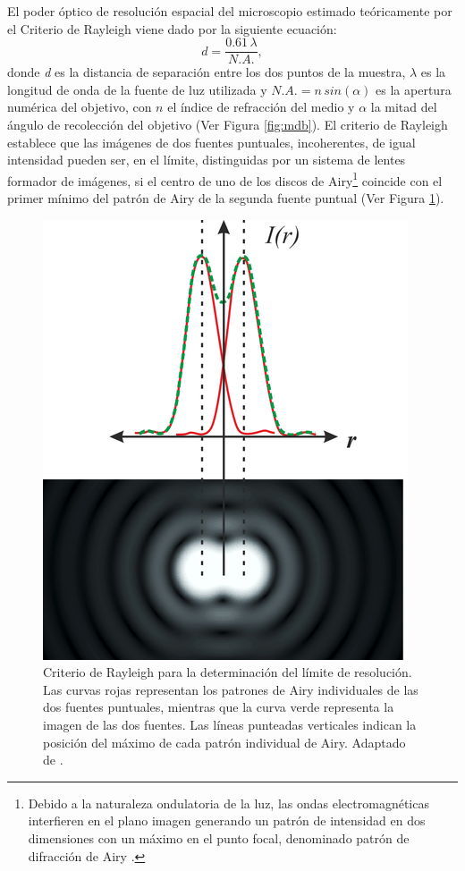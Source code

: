 El poder óptico de resolución espacial del microscopio estimado teóricamente por el Criterio de Rayleigh viene dado por la siguiente ecuación:
\begin{equation}
d = \frac{0.61 \hspace{2pt} \lambda}{ N.A.},
\end{equation}
donde \textit{d} es la distancia de separación entre los dos puntos de la muestra, $\lambda$ es la longitud de onda de la fuente de luz utilizada y $N.A. = n \hspace{2pt} sin(\alpha)$ es la apertura numérica del objetivo, con $n$ el índice de refracción del medio y $\alpha$ la mitad del ángulo de recolección del objetivo (Ver Figura \ref{fig:mdb}). El criterio de Rayleigh establece que las imágenes de dos fuentes puntuales, incoherentes, de igual intensidad pueden ser, en el límite, distinguidas por un sistema de lentes formador de imágenes, si el centro de uno de los discos de Airy\footnote{Debido a la naturaleza ondulatoria de la luz, las ondas
electromagnéticas interfieren en el plano imagen generando un patrón de intensidad en dos dimensiones con
un máximo en el punto focal, denominado patrón de difracción de Airy \cite{hecht2012optics}.} coincide con el primer mínimo del patrón de Airy de la segunda fuente puntual (Ver Figura \ref{fig:critrayspa}).

\begin{figure}[H]
	\centering
	\includegraphics[scale=1.0]{Figs/microespectrometro/raylspa.png}
	\caption{Criterio de Rayleigh para la determinación del límite de resolución. Las curvas rojas representan los patrones de Airy individuales de las dos fuentes puntuales, mientras que la curva verde representa la imagen de las dos fuentes. Las líneas punteadas verticales indican la posición del máximo de cada patrón individual de Airy. Adaptado de \cite{raylsp}.}
	\label{fig:critrayspa}
\end{figure}

